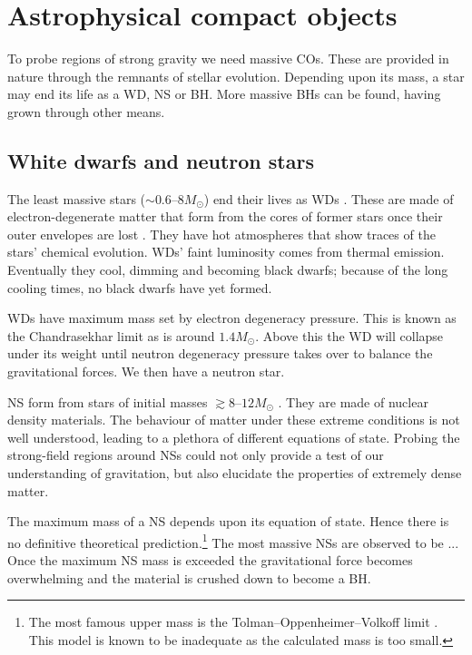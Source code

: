 \section{Astrophysical compact objects}

To probe regions of strong gravity we need massive COs. These are provided in nature through the remnants of stellar evolution. Depending upon its mass, a star may end its life as a WD, NS or BH. More massive BHs can be found, having grown through other means.

\subsection{White dwarfs and neutron stars}

The least massive stars ($\sim0.6$--$8M_\odot$) end their lives as WDs \citep{Poelarends2008}. These are made of electron-degenerate matter that form from the cores of former stars once their outer envelopes are lost \citep{Althaus2010}. They have hot atmospheres that show traces of the stars' chemical evolution. WDs' faint luminosity comes from thermal emission. Eventually they cool, dimming and becoming black dwarfs; because of the long cooling times, no black dwarfs have yet formed.

WDs have maximum mass set by electron degeneracy pressure. This is known as the Chandrasekhar limit as is around $1.4 M_\odot$.%
Above this the WD will collapse under its weight until neutron degeneracy pressure takes over to balance the gravitational forces. We then have a neutron star.

NS form from stars of initial masses $\gtrsim 8$--$12 M_\odot$ \citep{Poelarends2008,Langer2012}. They are made of nuclear density materials. The behaviour of matter under these extreme conditions is not well understood, leading to a plethora of different equations of state. Probing the strong-field regions around NSs could not only provide a test of our understanding of gravitation, but also elucidate the properties of extremely dense matter.

The maximum mass of a NS depends upon its equation of state. Hence there is no definitive theoretical prediction.\footnote{The most famous upper mass is the Tolman--Oppenheimer--Volkoff limit \citep{Tolman1939,Oppenheimer1939}. This model is known to be inadequate as the calculated mass is too small.} The most massive NSs are observed to be ... Once the maximum NS mass is exceeded the gravitational force becomes overwhelming and the material is crushed down to become a BH.

